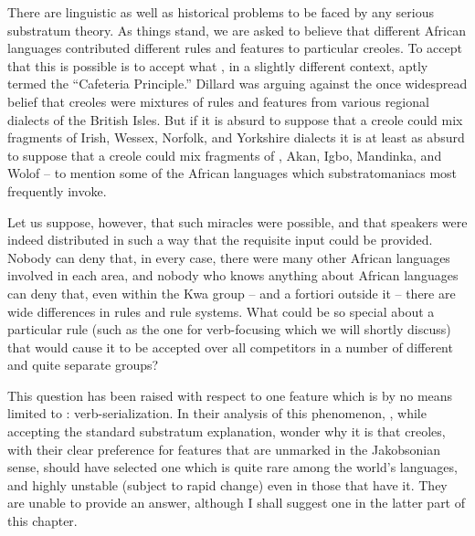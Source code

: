There are linguistic as well as historical problems to be faced by any serious substratum theory. As things stand, we are asked to believe that different African languages contributed different rules and features to particular creoles. To accept that this is possible is to accept what \citet{Dillard1970}, in a slightly different context, aptly termed the ``Cafe\-teria Principle.'' Dillard was arguing against the once widespread belief that creoles were mixtures of rules and features from various regional dialects of the British Isles. But if it is absurd to suppose that a creole could mix fragments of Irish, Wessex, Norfolk, and Yorkshire dialects it is at least as absurd to suppose that a creole could mix fragments of , Akan, Igbo, Mandinka, and Wolof -- to mention some of the African languages which substratomaniacs most frequently invoke.

Let us suppose, however, that such miracles were possible, and that  speakers were indeed distributed in such a way that the
requisite input could be provided. Nobody can deny that, in every case, there were many other African languages involved in each area, and nobody who knows anything about African languages can deny that, even within the Kwa group -- and a fortiori outside it -- there are wide differences in rules and rule systems. What could be so special about a particular  rule (such as the one for verb-focusing which we will shortly discuss) that would cause it to be accepted over all compe\-titors in a number of different and quite separate groups?

This question has been raised with respect to one feature which is by no means limited to : verb-serialization. In their analysis of this phenomenon, \citet{JansenEtAl1978}, while accepting the standard substratum explanation, wonder why it is that creoles, with their clear preference for features that are unmarked in the Jakobsonian sense, should have selected one which is quite rare among the world's languages, and highly unstable (subject to rapid change) even in those that have it. They are unable to provide an answer, although I shall suggest one in the latter part of this chapter.

